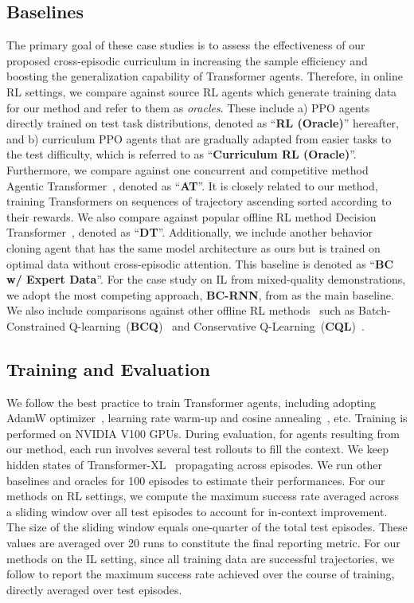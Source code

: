 

\subsection{Baselines}
The primary goal of these case studies is to assess the effectiveness of our proposed cross-episodic curriculum in increasing the sample efficiency and boosting the generalization capability of Transformer agents. Therefore, in online RL settings, we compare against source RL agents which generate training data for our method and refer to them as \textit{oracles}. These include a) PPO agents directly trained on test task distributions, denoted as ``\textbf{RL (Oracle)}'' hereafter, and b) curriculum PPO agents that are gradually adapted from easier tasks to the test difficulty, which is referred to as ``\textbf{Curriculum RL (Oracle)}''.
Furthermore, we compare against one concurrent and competitive method Agentic Transformer~\citep{liu2023emergent}, denoted as ``\textbf{AT}''. It is closely related to our method, training Transformers on sequences of trajectory ascending sorted according to their rewards.
We also compare against popular offline RL method Decision Transformer~\citep{chen2021decisiontransformer}, denoted as ``\textbf{DT}''.
Additionally, we include another behavior cloning agent that has the same model architecture as ours but is trained on optimal data without cross-episodic attention. 
This baseline is denoted as ``\textbf{BC w/ Expert Data}''.
For the case study on IL from mixed-quality demonstrations, we adopt the most competing approach, \textbf{BC-RNN}, from \citet{mandlekar2021matters} as the main baseline. We also include comparisons against other offline RL methods~\citep{levine2020offline} such as Batch-Constrained Q-learning~(\textbf{BCQ})~\citep{fujimoto2018offpolicy} and Conservative Q-Learning~(\textbf{CQL})~\citep{kumar2020conservative}.


\subsection{Training and Evaluation}
We follow the best practice to train Transformer agents, including adopting AdamW optimizer~\citep{loshchilov2019decoupled}, learning rate warm-up and cosine annealing~\citep{loshchilov17cosinelr}, etc.
Training is performed on NVIDIA V100 GPUs. 
During evaluation, for agents resulting from our method, each run involves several test rollouts to fill the context. We keep hidden states of Transformer-XL~\citep{dai2019transformerxl} propagating across episodes.
We run other baselines and oracles for 100 episodes to estimate their performances.
For our methods on RL settings, we compute the maximum success rate averaged across a sliding window over all test episodes to account for in-context improvement.
The size of the sliding window equals one-quarter of the total test episodes.
These values are averaged over 20 runs to constitute the final reporting metric.
For our methods on the IL setting, since all training data are successful trajectories, we follow \citet{mandlekar2021matters} to report the maximum success rate achieved over the course of training, directly averaged over test episodes.

